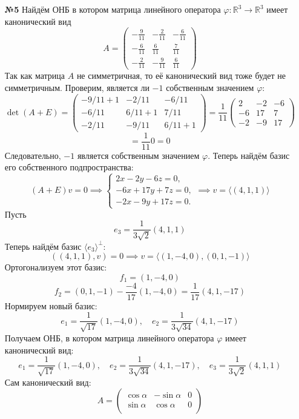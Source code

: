 \documentclass[a4paper]{article}
\renewcommand{\f}[2]{\frac{#1}{#2}}
\renewcommand{\phi}{\varphi}
\newcommand{\RR}{\mathbb{R}}
\begin{document}
\begin{enumerate}
    \item[\textbf{№5}]Найдём ОНБ в котором матрица линейного оператора
     $\phi : \RR^3 \to \RR^3$ имеет канонический вид
    $$A = 
    \begin{pmatrix}
    -\tfrac{9}{11} & -\tfrac{2}{11} & -\tfrac{6}{11}\\[4pt]
    -\tfrac{6}{11} & \tfrac{6}{11}  & \tfrac{7}{11}\\[4pt]
    -\tfrac{2}{11} & -\tfrac{9}{11} & \tfrac{6}{11}
    \end{pmatrix}$$
    Так как матрица $A$ не симметричная, то её канонический вид тоже будет не симметричным. 
    Проверим, является ли $-1$ собственным значением $\phi$:
    $$\det (A + E) = \begin{pmatrix}
    -9/11+1 & -2/11   & -6/11\\[4pt]
    -6/11   & 6/11+1  & 7/11\\[4pt]
    -2/11   & -9/11   & 6/11+1
    \end{pmatrix}  = \frac1{11}
    \begin{pmatrix}
    2 & -2  & -6\\
    -6& 17  & 7\\
    -2& -9  & 17
    \end{pmatrix}$$
    $$=\f{1}{11}0 = 0$$
    Следовательно, $-1$ является собственным значением $\phi$.
    Теперь найдём базис его собственного подпространства:
    $$(A + E)v = 0 \implies 
    \begin{cases}
    2x - 2y -6z =0,\\
    -6x +17y +7z=0,\\
    -2x -9y +17z=0.
    \end{cases} \implies v = \langle (4, 1, 1) \rangle
    $$
    Пусть 
    $$e_3 = \f{1}{3\sqrt{2}}(4, 1, 1)$$
    Теперь найдём базис $\langle e_3 \rangle ^ \perp$:
    $$((4, 1, 1), v) = 0 \implies v = \langle (1, -4, 0), (0, 1, -1) \rangle$$
    Ортогонализуем этот базис:
    $$f_1 = (1, -4, 0)$$
    $$f_2 = (0, 1, -1) - \f{-4}{17}(1, -4, 0) = \f{1}{17}(4, 1, -17)$$
    Нормируем новый базис:
    $$e_1 = \frac1{\sqrt{17}}(1,-4,0), \quad e_2 = \frac1{3\sqrt{34}}(4,1,-17)$$
    Получаем ОНБ, в котором матрица линейного оператора $\phi$ имеет канонический вид:
    $$e_1 = \frac1{\sqrt{17}}(1,-4,0), \quad e_2 = \frac1{3\sqrt{34}}(4,1,-17), \quad e_3 = \f{1}{3\sqrt{2}}(4, 1, 1)$$
    Сам канонический вид:
    $$A=\begin{pmatrix}
    \cos\alpha & -\sin\alpha & 0\\
    \sin\alpha & \cos\alpha & 0\\

\end{pmatrix}$$
\end{enumerate}
\end{document}
